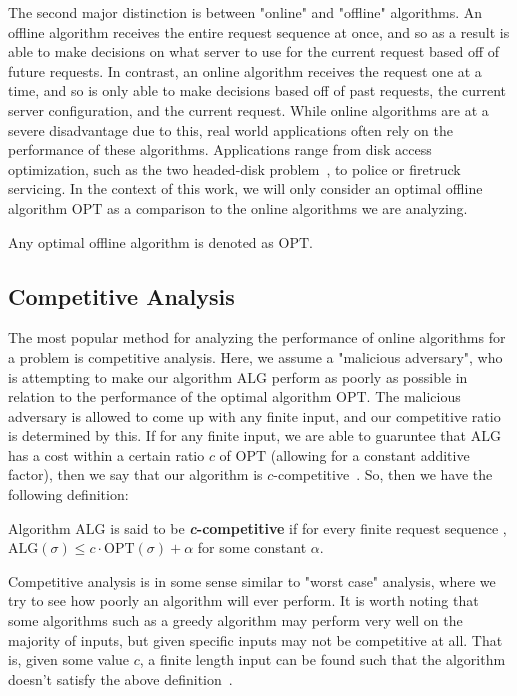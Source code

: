 The second major distinction is between "online" and "offline" algorithms. An offline algorithm receives the entire request sequence at once, and so as a result is able to make decisions on what server to use for the current request based off of future requests. In contrast, an online algorithm receives the request one at a time, and so is only able to make decisions based off of past requests, the current server configuration, and the current request. While online algorithms are at a severe disadvantage due to this, real world applications often rely on the performance of these algorithms. Applications range from disk access optimization, such as the two headed-disk problem~\cite{OnlineComp1998}, to police or firetruck servicing. In the context of this work, we will only consider an optimal offline algorithm $\mathrm{OPT}$ as a comparison to the online algorithms we are analyzing.

\begin{definition}
    Any optimal offline algorithm is denoted as $\mathrm{OPT}$.
\end{definition}

\subsection{Competitive Analysis}
\label{sec:compAna}
The most popular method for analyzing the performance of online algorithms for a problem is competitive analysis. Here, we assume a "malicious adversary", who is attempting to make our algorithm $\mathrm{ALG}$ perform as poorly as possible in relation to the performance of the optimal algorithm $\mathrm{OPT}$. The malicious adversary is allowed to come up with any finite input, and our competitive ratio is determined by this. If for any finite input, we are able to guaruntee that $\mathrm{ALG}$ has a cost within a certain ratio $c$ of $\mathrm{OPT}$ (allowing for a constant additive factor), then we say that our algorithm is $c$-competitive~\cite{OnlineComp1998}. So, then we have the following definition: 

\begin{definition}
\label{def:comp}
Algorithm $\mathrm{ALG}$ is said to be \textbf{\textit{c}-competitive} if for every finite request sequence \s, $\mathrm{ALG}(\sigma) \leq c\cdot \mathrm{OPT}(\sigma)+\alpha$ for some constant $\alpha$.
\end{definition}

Competitive analysis is in some sense similar to "worst case" analysis, where we try to see how poorly an algorithm will ever perform. It is worth noting that some algorithms such as a greedy algorithm may perform very well on the majority of inputs, but given specific inputs may not be competitive at all. That is, given some value $c$, a finite length input can be found such that the algorithm doesn't satisfy the above definition~\cite{OnlineComp1998}.


